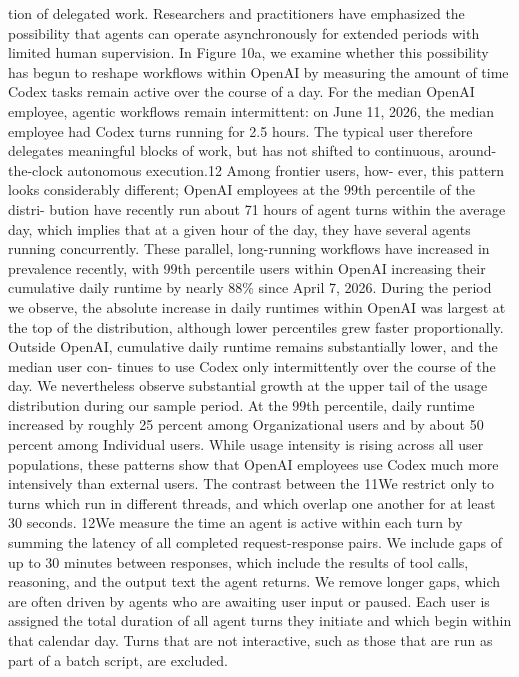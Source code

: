 tion of delegated work. Researchers and practitioners have emphasized the possibility that agents can
operate asynchronously for extended periods with limited human supervision.
In Figure 10a, we examine whether this possibility has begun to reshape workflows within OpenAI
by measuring the amount of time Codex tasks remain active over the course of a day. For the median
OpenAI employee, agentic workflows remain intermittent: on June 11, 2026, the median employee had
Codex turns running for 2.5 hours. The typical user therefore delegates meaningful blocks of work, but
has not shifted to continuous, around-the-clock autonomous execution.12 Among frontier users, how-
ever, this pattern looks considerably different; OpenAI employees at the 99th percentile of the distri-
bution have recently run about 71 hours of agent turns within the average day, which implies that at
a given hour of the day, they have several agents running concurrently. These parallel, long-running
workflows have increased in prevalence recently, with 99th percentile users within OpenAI increasing
their cumulative daily runtime by nearly 88\% since April 7, 2026. During the period we observe, the
absolute increase in daily runtimes within OpenAI was largest at the top of the distribution, although
lower percentiles grew faster proportionally.
Outside OpenAI, cumulative daily runtime remains substantially lower, and the median user con-
tinues to use Codex only intermittently over the course of the day. We nevertheless observe substantial
growth at the upper tail of the usage distribution during our sample period. At the 99th percentile, daily
runtime increased by roughly 25 percent among Organizational users and by about 50 percent among
Individual users. While usage intensity is rising across all user populations, these patterns show that
OpenAI employees use Codex much more intensively than external users. The contrast between the
11We restrict only to turns which run in different threads, and which overlap one another for at least 30 seconds.
12We measure the time an agent is active within each turn by summing the latency of all completed request-response pairs. We
include gaps of up to 30 minutes between responses, which include the results of tool calls, reasoning, and the output text
the agent returns. We remove longer gaps, which are often driven by agents who are awaiting user input or paused. Each
user is assigned the total duration of all agent turns they initiate and which begin within that calendar day. Turns that are
not interactive, such as those that are run as part of a batch script, are excluded.
